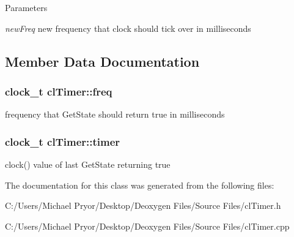 \begin{DoxyParams}{Parameters}
\item[{\em newFreq}]new frequency that clock should tick over in milliseconds \end{DoxyParams}


\subsection{Member Data Documentation}
\hypertarget{classcl_timer_a72b7305f6dcd12bbf782fc9fbbc68b4e}{
\subsubsection[{freq}]{\setlength{\rightskip}{0pt plus 5cm}clock\_\-t {\bf clTimer::freq}}}
\label{classcl_timer_a72b7305f6dcd12bbf782fc9fbbc68b4e}
frequency that GetState should return true in milliseconds \hypertarget{classcl_timer_a8c93f49afaed2dc361b11bd8d0edff1f}{
\subsubsection[{timer}]{\setlength{\rightskip}{0pt plus 5cm}clock\_\-t {\bf clTimer::timer}}}
\label{classcl_timer_a8c93f49afaed2dc361b11bd8d0edff1f}
clock() value of last GetState returning true 

The documentation for this class was generated from the following files:\begin{DoxyCompactItemize}
\item 
C:/Users/Michael Pryor/Desktop/Deoxygen Files/Source Files/clTimer.h\item 
C:/Users/Michael Pryor/Desktop/Deoxygen Files/Source Files/clTimer.cpp\end{DoxyCompactItemize}
